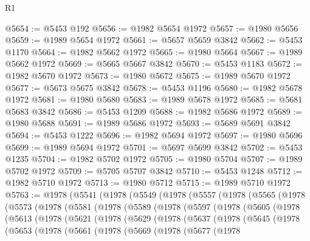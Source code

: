\begin{lexlean}{R1}
\begin{coremodule}
@5654 := @5453 @192
@5656 := @1982 @5654 @1972
@5657 := @1980 @5656
@5659 := @1989 @5654 @1972
@5661 := @5657 @5659 @3842
@5662 := @5453 @1170
@5664 := @1982 @5662 @1972
@5665 := @1980 @5664
@5667 := @1989 @5662 @1972
@5669 := @5665 @5667 @3842
@5670 := @5453 @1183
@5672 := @1982 @5670 @1972
@5673 := @1980 @5672
@5675 := @1989 @5670 @1972
@5677 := @5673 @5675 @3842
@5678 := @5453 @1196
@5680 := @1982 @5678 @1972
@5681 := @1980 @5680
@5683 := @1989 @5678 @1972
@5685 := @5681 @5683 @3842
@5686 := @5453 @1209
@5688 := @1982 @5686 @1972
@5689 := @1980 @5688
@5691 := @1989 @5686 @1972
@5693 := @5689 @5691 @3842
@5694 := @5453 @1222
@5696 := @1982 @5694 @1972
@5697 := @1980 @5696
@5699 := @1989 @5694 @1972
@5701 := @5697 @5699 @3842
@5702 := @5453 @1235
@5704 := @1982 @5702 @1972
@5705 := @1980 @5704
@5707 := @1989 @5702 @1972
@5709 := @5705 @5707 @3842
@5710 := @5453 @1248
@5712 := @1982 @5710 @1972
@5713 := @1980 @5712
@5715 := @1989 @5710 @1972
@5763 := @1978
    (@5541
      (@1978
        (@5549
          (@1978
            (@5557
              (@1978
                (@5565
                  (@1978
                    (@5573
                      (@1978
                        (@5581
                          (@1978
                            (@5589
                              (@1978
                                (@5597
                                  (@1978
                                    (@5605
                                      (@1978
                                        (@5613
                                          (@1978
                                            (@5621
                                              (@1978
                                                (@5629
                                                  (@1978
                                                    (@5637
                                                      (@1978
                                                        (@5645
                                                          (@1978
                                                            (@5653
                                                              (@1978
                                                                (@5661
                                                                  (@1978
                                                                    (@5669
                                                                      (@1978
                                                                        (@5677
                                                                          (@1978

\end{coremodule}
\end{lexlean}
